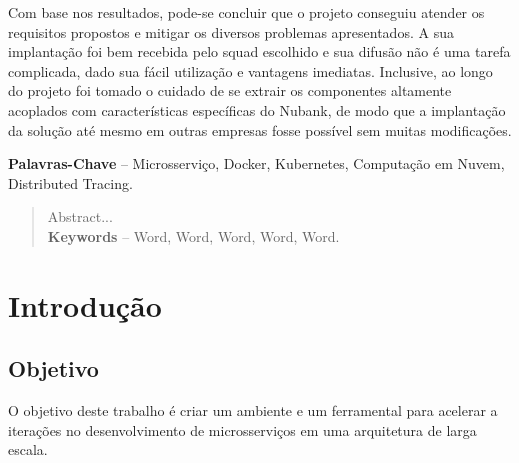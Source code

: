 \documentclass[twosideprint]{politex}
\begin{document}
\begin{resumo}
	Com base nos resultados, pode-se concluir que o projeto conseguiu atender os requisitos propostos e mitigar os diversos problemas apresentados. A sua implantação foi bem recebida pelo squad escolhido e sua difusão não é uma tarefa complicada, dado sua fácil utilização e vantagens imediatas. Inclusive, ao longo do projeto foi tomado o cuidado de se extrair os componentes altamente acoplados com características específicas do Nubank, de modo que a implantação da solução até mesmo em outras empresas fosse possível sem muitas modificações.
	
%
%
\textbf{Palavras-Chave} -- Microsserviço, Docker, Kubernetes, Computação em Nuvem, Distributed Tracing.
\end{resumo}


\begin{abstract}
Abstract...
%
\\[3\baselineskip]
%
\textbf{Keywords} -- Word, Word, Word, Word, Word.
\end{abstract}


\listadefiguras
\listadetabelas




\sumario




	
\chapter{Introdução}
	\section{Objetivo}
	O objetivo deste trabalho é criar um ambiente e um ferramental para acelerar a iterações no desenvolvimento de microsserviços em uma arquitetura de larga escala.
\end{document}
